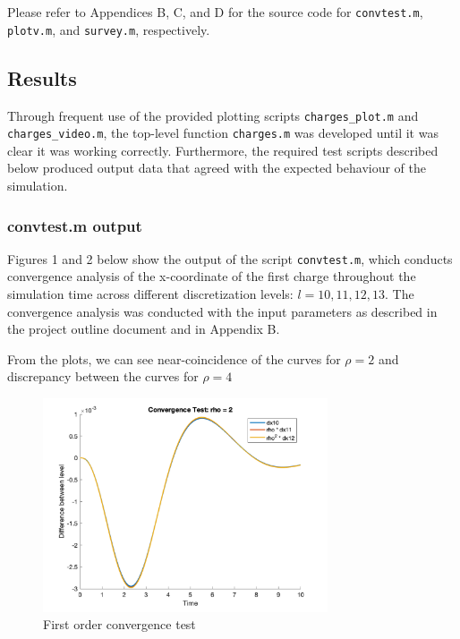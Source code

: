 \documentclass[10pt]{article}
\def\code#1{\texttt{#1}} %
\begin{document}
Please refer to Appendices B, C, and D for the source code for \code{convtest.m}, \code{plotv.m}, and
\code{survey.m}, respectively.

\subsection*{Results}

Through frequent use of the provided plotting scripts \code{charges\_plot.m} and \code{charges\_video.m}, 
the top-level function \code{charges.m} was developed until it was clear it was working correctly. 
Furthermore, the required test scripts described below produced output data that agreed with the expected
behaviour of the simulation. 

\subsubsection*{convtest.m output}

Figures 1 and 2 below show the output of the script \code{convtest.m}, which conducts convergence analysis
of the x-coordinate of the first charge throughout the simulation time across different discretization 
levels: $l=10, 11, 12, 13$. The convergence analysis was conducted with the input parameters as described 
in the project outline document and in Appendix B. 

From the plots, we can see near-coincidence of the curves for $\rho=2$ and discrepancy between the curves 
for $\rho=4$

\begin{figure}[H]
\centering
\includegraphics[width=0.75\textwidth]{ConvTest_2.png}
\caption{First order convergence test}
\end{figure}
\end{document}
